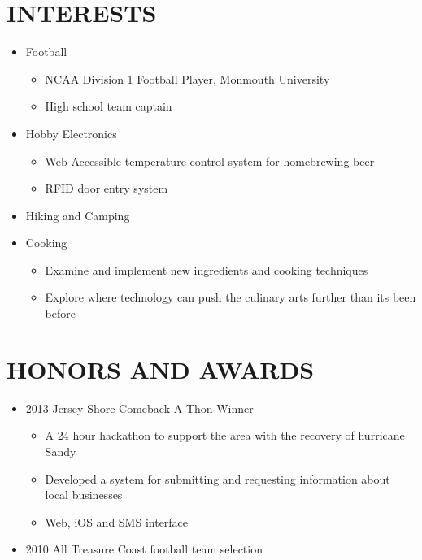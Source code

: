 \documentclass{res}
\begin{document}
\begin{resume}
\section{INTERESTS}          
    \begin{itemize}
        \item Football
            \begin{itemize}
                \item NCAA Division 1 Football Player, Monmouth University
                \item High school team captain
            \end{itemize}
        \item Hobby Electronics
            \begin{itemize}
                \item Web Accessible temperature control system for homebrewing beer
                \item RFID door entry system
            \end{itemize}
        \item Hiking and Camping
        \item Cooking
          \begin{itemize}
            \item Examine and implement new ingredients and cooking techniques
            \item Explore where technology can push the culinary arts further than its been before
          \end{itemize}
    \end{itemize}
 

\section{HONORS AND AWARDS}          
    \begin{itemize}
        \item 2013 Jersey Shore Comeback-A-Thon Winner
            \begin{itemize}
                \item A 24 hour hackathon to support the area with the recovery of hurricane Sandy
                \item Developed a system for submitting and requesting information about local businesses
                \item Web, iOS and SMS interface
            \end{itemize}
        \item 2010 All Treasure Coast football team selection
    \end{itemize}
 
 
\end{resume}
\end{document}
